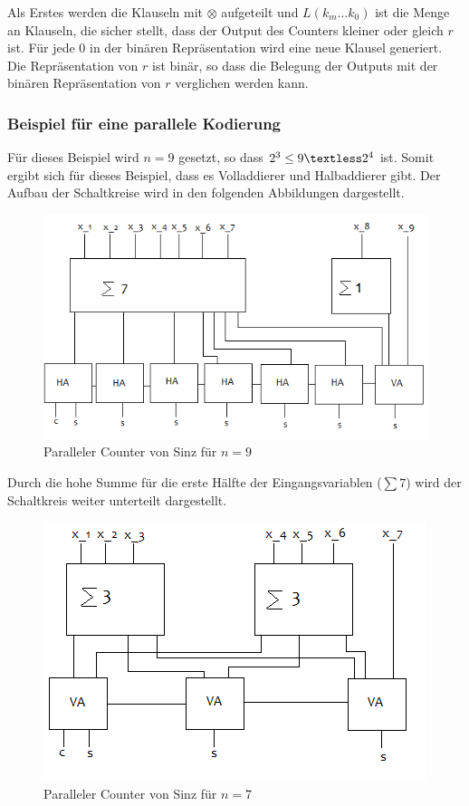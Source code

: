 \documentclass[a4,abstract=on]{scrartcl}
\begin{document}
Als Erstes werden die Klauseln mit $\otimes$ aufgeteilt und $L(k_{m} \dots k_0)$ ist die Menge an Klauseln, die sicher stellt, dass der Output des Counters kleiner oder gleich $r$ ist. Für jede $0$ in der binären Repräsentation wird eine neue Klausel generiert.
Die Repräsentation von $r$ ist binär, so dass die Belegung der Outputs mit der binären Repräsentation von $r$ verglichen werden kann.

\subsubsection{Beispiel für eine parallele Kodierung}
Für dieses Beispiel wird $n=9$ gesetzt, so dass $2^3 \leq 9 \textless 2^4$ ist. Somit ergibt sich für dieses Beispiel, dass es Volladdierer und Halbaddierer gibt. Der Aufbau der Schaltkreise wird in den folgenden Abbildungen dargestellt.

\begin{figure}[H]
\centering
\includegraphics[width=\textwidth]{Bsp_Sinz_grob.png}
\caption{Paralleler Counter von Sinz für $n=9$}
\label{fig:sinz_counter_para_bsp}
\end{figure}

Durch die hohe Summe für die erste Hälfte der Eingangsvariablen ($\sum7$) wird der Schaltkreis weiter unterteilt dargestellt.

\begin{figure}[H]
\centering
\includegraphics[width=\textwidth]{Bsp_Sinz_fein.png}
\caption{Paralleler Counter von Sinz für $n=7$}
\label{fig:sinz_counter_para_bsp}
\end{figure}
\end{document}
